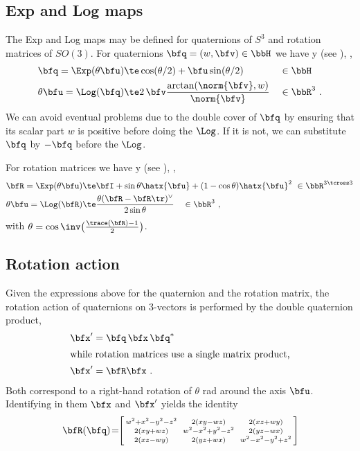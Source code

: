 \subsection{Exp and Log maps}

The Exp and Log maps may be defined for quaternions of $S^3$ and rotation matrices of $SO(3)$. 
For quaternions $\bfq=(w,\bfv)\in\bbH$ we have%
%
\if \examples y (see ), \else, \fi
%
%
\begin{align}
\bfq= \Exp(\theta\bfu) &\te \cos(\theta/2) + \bfu\sin(\theta/2) &&\in\bbH\\ 
\theta\bfu = \Log(\bfq) &\te 2\,\bfv\frac{\arctan({\norm{\bfv},w})}{\norm{\bfv}}&&\in\bbR^3
~.
\end{align}
%
We can avoid eventual problems due to the double cover of $\bfq$ by ensuring that its scalar part $w$ is positive before doing the $\Log$. 
If it is not, we can substitute $\bfq$ by $-\bfq$ before the $\Log$.

For rotation matrices we have%
%
\if \examples y (see ), \else, \fi
%
\begin{align}
\bfR= \Exp(\theta\bfu) &\te \bfI + \sin\theta\hatx{\bfu} + (1-\cos\theta)\hatx{\bfu}^2~ \label{equ:rodrigues} \in\bbR^{3\tcross3}\\ 
\theta\bfu = \Log(\bfR) &\te \frac{\theta(\bfR-\bfR\tr)^\vee}{2\sin\theta} \quad\in\bbR^3
~,
\end{align}
%
with $\theta=\cos\inv\big(\frac{\trace(\bfR)-1}{2}\big)$.



\subsection{Rotation action}

Given the expressions above for the quaternion and the rotation matrix, the rotation action of quaternions on 3-vectors is performed by the double quaternion product,
%
\begin{align}
\bfx' &= \bfq\,\bfx\,\bfq^* \\
\intertext{while rotation matrices use a single matrix product,}
\bfx' &= \bfR\bfx
~.
\end{align}
%
Both correspond to a right-hand rotation of $\theta$ rad around the axis $\bfu$.
Identifying in them $\bfx$ and $\bfx'$ yields the identity
%
\begin{align}\label{equ:q2R}
\bfR
(\bfq) \!=\!\! 
\begin{bsmallmatrix}
w^2+x^2-y^2-z^2 &~ 2(xy-wz) &~ 2(xz+wy) \\ 
2(xy+wz) &~ w^2-x^2+y^2-z^2 &~ 2(yz-wx) \\
2(xz-wy) &~ 2(yz+wx) &~ w^2-x^2-y^2+z^2
\end{bsmallmatrix}\!
\end{align}



